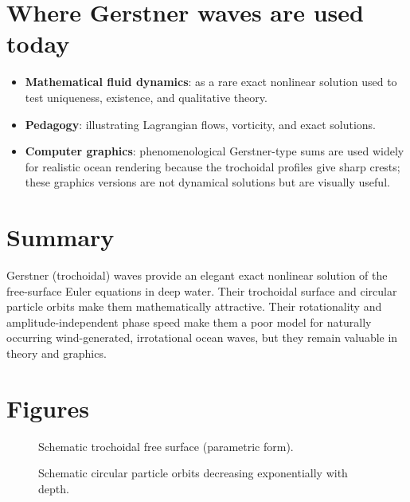 \documentclass[11pt]{article}
\begin{document}
\section{Where Gerstner waves are used today}
\begin{itemize}
\item \textbf{Mathematical fluid dynamics}: as a rare exact nonlinear solution used to test uniqueness, existence, and qualitative theory.
\item \textbf{Pedagogy}: illustrating Lagrangian flows, vorticity, and exact solutions.
\item \textbf{Computer graphics}: phenomenological Gerstner-type sums are used widely for realistic ocean rendering because the trochoidal profiles give sharp crests; these graphics versions are not dynamical solutions but are visually useful.
\end{itemize}

\section{Summary}
Gerstner (trochoidal) waves provide an elegant exact nonlinear solution of the free-surface Euler equations in deep water. Their trochoidal surface and circular particle orbits make them mathematically attractive. Their rotationality and amplitude-independent phase speed make them a poor model for naturally occurring wind-generated, irrotational ocean waves, but they remain valuable in theory and graphics.

\section*{Figures}
\begin{figure}[h!]
\centering
{}
\caption{Schematic trochoidal free surface (parametric form).}
\end{figure}

\begin{figure}[h!]
\centering
{}
\caption{Schematic circular particle orbits decreasing exponentially with depth.}
\end{figure}
\end{document}
